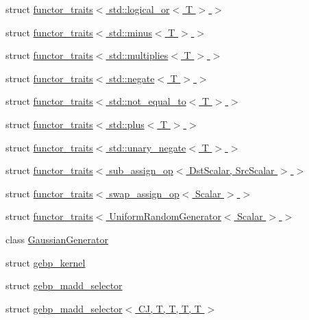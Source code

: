 \begin{DoxyCompactItemize}
\item 
struct \hyperlink{struct_eigen_1_1internal_1_1functor__traits_3_01std_1_1logical__or_3_01_t_01_4_01_4}{functor\+\_\+traits$<$ std\+::logical\+\_\+or$<$ T $>$ $>$}
\item 
struct \hyperlink{struct_eigen_1_1internal_1_1functor__traits_3_01std_1_1minus_3_01_t_01_4_01_4}{functor\+\_\+traits$<$ std\+::minus$<$ T $>$ $>$}
\item 
struct \hyperlink{struct_eigen_1_1internal_1_1functor__traits_3_01std_1_1multiplies_3_01_t_01_4_01_4}{functor\+\_\+traits$<$ std\+::multiplies$<$ T $>$ $>$}
\item 
struct \hyperlink{struct_eigen_1_1internal_1_1functor__traits_3_01std_1_1negate_3_01_t_01_4_01_4}{functor\+\_\+traits$<$ std\+::negate$<$ T $>$ $>$}
\item 
struct \hyperlink{struct_eigen_1_1internal_1_1functor__traits_3_01std_1_1not__equal__to_3_01_t_01_4_01_4}{functor\+\_\+traits$<$ std\+::not\+\_\+equal\+\_\+to$<$ T $>$ $>$}
\item 
struct \hyperlink{struct_eigen_1_1internal_1_1functor__traits_3_01std_1_1plus_3_01_t_01_4_01_4}{functor\+\_\+traits$<$ std\+::plus$<$ T $>$ $>$}
\item 
struct \hyperlink{struct_eigen_1_1internal_1_1functor__traits_3_01std_1_1unary__negate_3_01_t_01_4_01_4}{functor\+\_\+traits$<$ std\+::unary\+\_\+negate$<$ T $>$ $>$}
\item 
struct \hyperlink{struct_eigen_1_1internal_1_1functor__traits_3_01sub__assign__op_3_01_dst_scalar_00_01_src_scalar_01_4_01_4}{functor\+\_\+traits$<$ sub\+\_\+assign\+\_\+op$<$ Dst\+Scalar, Src\+Scalar $>$ $>$}
\item 
struct \hyperlink{struct_eigen_1_1internal_1_1functor__traits_3_01swap__assign__op_3_01_scalar_01_4_01_4}{functor\+\_\+traits$<$ swap\+\_\+assign\+\_\+op$<$ Scalar $>$ $>$}
\item 
struct \hyperlink{struct_eigen_1_1internal_1_1functor__traits_3_01_uniform_random_generator_3_01_scalar_01_4_01_4}{functor\+\_\+traits$<$ Uniform\+Random\+Generator$<$ Scalar $>$ $>$}
\item 
class \hyperlink{class_eigen_1_1internal_1_1_gaussian_generator}{Gaussian\+Generator}
\item 
struct \hyperlink{struct_eigen_1_1internal_1_1gebp__kernel}{gebp\+\_\+kernel}
\item 
struct \hyperlink{struct_eigen_1_1internal_1_1gebp__madd__selector}{gebp\+\_\+madd\+\_\+selector}
\item 
struct \hyperlink{struct_eigen_1_1internal_1_1gebp__madd__selector_3_01_c_j_00_01_t_00_01_t_00_01_t_00_01_t_01_4}{gebp\+\_\+madd\+\_\+selector$<$ C\+J, T, T, T, T $>$}

\end{DoxyCompactItemize}

